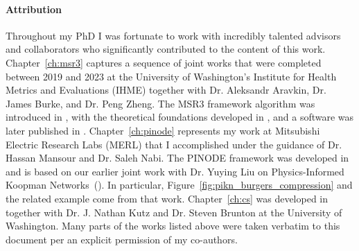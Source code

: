 \paragraph{Attribution} Throughout my PhD I was fortunate to work with incredibly talented advisors and collaborators who significantly contributed to the content of this work. Chapter~\ref{ch:msr3} captures a sequence of joint works that were completed between 2019 and 2023 at the University of Washington's Institute for Health Metrics and Evaluations (IHME) together with Dr. Aleksandr Aravkin, Dr. James Burke, and Dr. Peng Zheng. The MSR3 framework algorithm was introduced in \cite{sholokhov2022relaxation}, with the theoretical foundations developed in \cite{aravkin2022jimtheory}, and a software was later published in \cite{sholokhov2023msr3joss}. Chapter~\ref{ch:pinode} represents my work at Mitsubishi Electric Research Labs (MERL) that I accomplished under the guidance of Dr. Hassan Mansour and Dr. Saleh Nabi. The PINODE framework was developed in \cite{sholokhov2023pinode} and is based on our earlier joint work with Dr. Yuying Liu on Physics-Informed Koopman Networks~(\cite{liu2022physics}). In particular, Figure~\ref{fig:pikn_burgers_compression} and the related example come from that work. Chapter~\ref{ch:cs} was developed in~\cite{sholokhov2023cs} together with Dr. J. Nathan Kutz and Dr. Steven Brunton at the University of Washington. Many parts of the works listed above were taken verbatim to this document per an explicit permission of my co-authors.